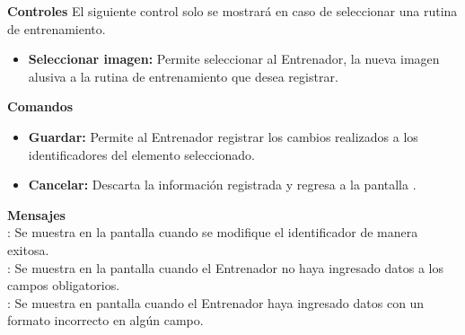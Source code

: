 \textbf{\textcolor[rgb]{0, 0, 0.545098}{Controles}}
El siguiente control solo se mostrará en caso de seleccionar una rutina de entrenamiento.
\begin{itemize}
	\item \textbf{\textcolor[rgb]{0, 0, 0.545098}{Seleccionar imagen:}} Permite seleccionar al Entrenador, la nueva imagen alusiva a la rutina de entrenamiento que desea registrar.
\end{itemize}
\vspace{1em}

\textbf{\textcolor[rgb]{0, 0, 0.545098}{Comandos}}
\begin{itemize}
	\item \textbf{\textcolor[rgb]{0, 0, 0.545098}{Guardar:}} Permite al Entrenador registrar los cambios realizados a los identificadores del elemento seleccionado. 
	\item \textbf{\textcolor[rgb]{0, 0, 0.545098}{Cancelar:}} Descarta la información registrada y regresa a la pantalla .
\end{itemize}

\vspace{1em}

\textbf{\textcolor[rgb]{0, 0, 0.545098}{Mensajes}}\\

\textbf{}: Se muestra en la pantalla  cuando se modifique el identificador de manera exitosa.\\
 
\textbf{}: Se muestra en la pantalla  cuando el Entrenador no haya ingresado datos a los campos obligatorios.\\

\textbf{}: Se muestra en pantalla cuando el Entrenador haya ingresado datos con un formato incorrecto en algún campo.

\clearpage